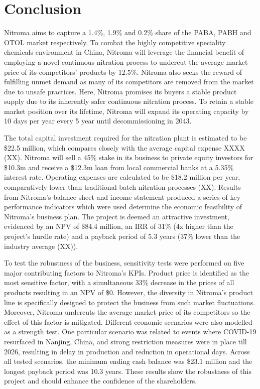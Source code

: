\section{Conclusion}
Nitroma aims to capture a 1.4\%, 1.9\% and 0.2\% share of the PABA, PABH and OTOL market respectively. To combat the highly competitive speciality chemicals environment in China, Nitroma will leverage the financial benefit of employing a novel continuous nitration process to undercut the average market price of its competitors’ products by 12.5\%. Nitroma also seeks the reward of fulfilling unmet demand as many of its competitors are removed from the market due to unsafe practices. Here, Nitroma promises its buyers a stable product supply due to its inherently safer continuous nitration process. To retain a stable market position over its lifetime, Nitroma will expand its operating capacity by 10 days per year every 5 year until decommissioning in 2043.

The total capital investment required for the nitration plant is estimated to be \$22.5 million, which compares closely with the average capital expense XXXX (XX). Nitroma will sell a 45\% stake in its business to private equity investors for \$10.3m and receive a \$12.3m loan from local commercial banks at a 5.35\% interest rate. Operating expenses are calculated to be \$18.2 million per year, comparatively lower than traditional batch nitration processes (XX).  Results from Nitroma’s balance sheet and income statement produced a series of key performance indicators which were used determine the economic feasibility of Nitroma’s business plan. The project is deemed an attractive investment, evidenced by an NPV of \$84.4 million, an IRR of 31\% (4x higher than the project’s hurdle rate) and a payback period of 5.3 years (37\% lower than the industry average (XX)).

To test the robustness of the business, sensitivity tests were performed on five major contributing factors to Nitroma’s KPIs. Product price is identified as the most sensitive factor, with a simultaneous 33\% decrease in the prices of all products resulting in an NPV of \$0. However, the diversity in Nitroma’s product line is specifically designed to protect the business from such market fluctuations. Moreover, Nitroma undercuts the average market price of its competitors so the effect of this factor is mitigated. Different economic scenarios were also modelled as a strength test. One particular scenario was related to events where COVID-19 resurfaced in Nanjing, China, and strong restriction measures were in place till 2026, resulting in delay in production and reduction in operational days. Across all tested scenarios, the minimum ending cash balance was \$23.1 million and the longest payback period was 10.3 years. These results show the robustness of this project and should enhance the confidence of the shareholders.